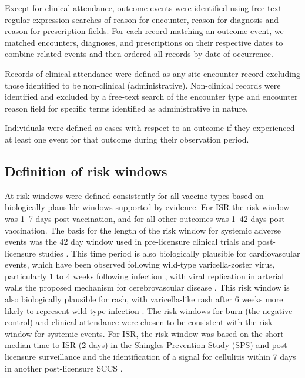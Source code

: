 \documentclass[review, endfloat]{elsarticle}
\begin{document}
Except for clinical attendance, outcome events were identified using free-text regular expression searches of reason for encounter, reason for diagnosis and reason for prescription fields. For each record matching an outcome event, we matched encounters, diagnoses, and prescriptions on their respective dates to combine related events and then ordered all records by date of occurrence. 

Records of clinical attendance were defined as any site encounter record excluding those identified to be non-clinical (administrative). Non-clinical records were identified and excluded by a free-text search of the encounter type and encounter reason field for specific terms identified as administrative in nature. 

Individuals were defined as cases with respect to an outcome if they experienced at least one event for that outcome during their observation period.

\subsection{Definition of risk windows}
\label{sec:risk_windows}

At-risk windows were defined consistently for all vaccine types based on biologically plausible windows supported by evidence. For ISR the risk-window was 1–7 days post vaccination, and for all other outcomes was 1–42 days post vaccination. The basis for the length of the risk window for systemic adverse events was the 42 day window used in pre-licensure clinical trials \citep{oxman2005, schmader2012, murray2011, simberkoff2010} and post-licensure studies \citep{tseng2012,baxter2012}. This time period is also biologically plausible for cardiovascular events, which have been observed following wild-type varicella-zoster virus, particularly 1 to 4 weeks following infection \citep{minassian2015,schink2016}, with viral replication in arterial walls the proposed mechanism for cerebrovascular disease \citep{gilden2009}. This risk window is also biologically plausible for rash, with varicella-like rash after 6 weeks more likely to represent wild-type infection \citep{willis2017herpes}. The risk windows for burn (the negative control) and clinical attendance were chosen to be consistent with the risk window for systemic events. For ISR, the risk window was based on the short median time to ISR (\~2 days) in the Shingles Prevention Study (SPS) and post-licensure surveillance \citep{willis2017herpes,simberkoff2010} and the identification of a signal for cellulitis within 7 days in another post-licensure SCCS \citep{tseng2012}.
\end{document}
